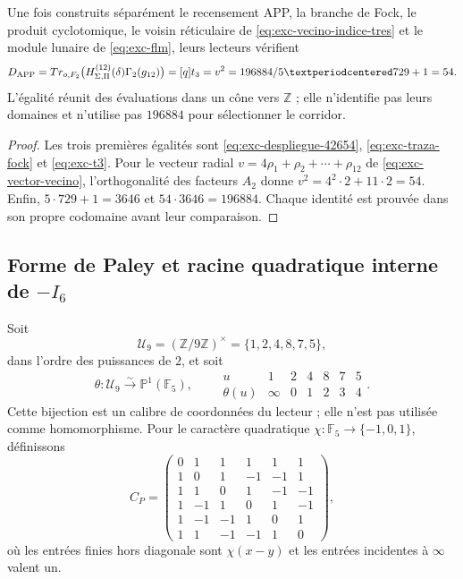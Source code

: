 \begin{theorem}
\label{thm:exc-cono-54}
Une fois construits séparément le recensement APP, la branche de Fock, le produit
cyclotomique, le voisin réticulaire de
\cref{eq:exc-vecino-indice-tres} et le module lunaire de
\cref{eq:exc-flm}, leurs lecteurs vérifient
\begin{equation}
 D_{\rm APP}
 =\operatorname{Tr}_{o,\mathcal F_2}
  \bigl(\mathcal H_{\Sigma,\Pi}^{(12)}(\delta)\Gamma_2(g_{12})\bigr)
 =[q]t_3=v^2=\frac{196884}{5\cdot729+1}=54.
 \label{eq:exc-cono-54}
\end{equation}
L'égalité réunit des évaluations dans un cône vers \(\mathbb Z\) ; elle
n'identifie pas leurs domaines et n'utilise pas \(196884\) pour sélectionner le corridor.
\end{theorem}

\begin{proof}
Les trois premières égalités sont
\eqref{eq:exc-despliegue-42654}, \eqref{eq:exc-traza-fock} et
\eqref{eq:exc-t3}. Pour le vecteur radial
\(v=4\rho_1+\rho_2+\cdots+\rho_{12}\) de
\eqref{eq:exc-vector-vecino}, l'orthogonalité des facteurs \(A_2\) donne
\(v^2=4^2\cdot2+11\cdot2=54\). Enfin,
\(5\cdot729+1=3646\) et \(54\cdot3646=196884\). Chaque identité est prouvée dans
son propre codomaine avant leur comparaison.
\end{proof}

\subsection{\texorpdfstring{Forme de Paley et racine quadratique interne de \(-I_6\)}{Forme de Paley et racine quadratique interne de -I6}}

Soit
\[
 \mathcal U_9=(\mathbb Z/9\mathbb Z)^\times=\{1,2,4,8,7,5\},
\]
dans l'ordre des puissances de \(2\), et soit
\begin{equation}
 \theta:\mathcal U_9\xrightarrow{\sim}\mathbb P^1(\mathbb F_5),
 \qquad
 \begin{array}{c|cccccc}
 u&1&2&4&8&7&5\\ \hline
 \theta(u)&\infty&0&1&2&3&4
 \end{array}.
 \label{eq:exc-calibre-proyectivo}
\end{equation}
Cette bijection est un calibre de coordonnées du lecteur ; elle n'est pas utilisée comme
homomorphisme. Pour le caractère quadratique
\(\chi:\mathbb F_5\to\{-1,0,1\}\), définissons
\begin{equation}
 C_P=
 \begin{pmatrix}
 0& 1& 1& 1& 1& 1\\
 1& 0& 1&-1&-1& 1\\
 1& 1& 0& 1&-1&-1\\
 1&-1& 1& 0& 1&-1\\
 1&-1&-1& 1& 0& 1\\
 1& 1&-1&-1& 1& 0
 \end{pmatrix},
 \label{eq:exc-matriz-paley}
\end{equation}
où les entrées finies hors diagonale sont \(\chi(x-y)\) et les
entrées incidentes à \(\infty\) valent un.

